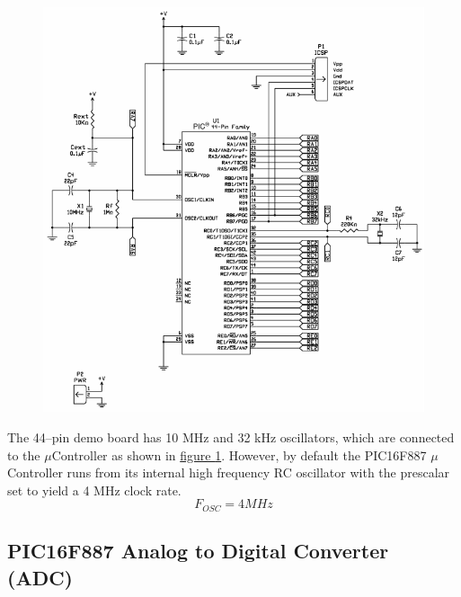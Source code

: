 \documentclass[11pt]{article}
\begin{document}
\begin{figure}
	\centering
	\includegraphics[width=1\textwidth]{Figures/demo-board-clock-power-programming-circuit.pdf}
	\label{demo-board-oscillators-circuit}
\end{figure}

The 44--pin demo board has 10 MHz and 32 kHz oscillators, which are connected to the
$\mu$Controller as shown in
\hyperref[demo-board-oscillators-circuit]{figure \ref{demo-board-oscillators-circuit}}.
However, by default the PIC16F887 $\mu$Controller runs from its internal high frequency RC oscillator
with the prescalar set to yield a 4 MHz clock rate.
\begin{equation*}
F_{OSC}=4MHz
\end{equation*}

\subsection{PIC16F887 Analog to Digital Converter (ADC)}
\end{document}
